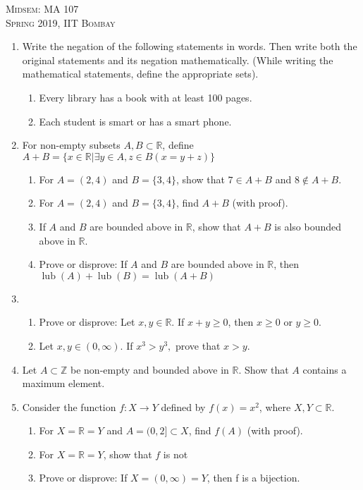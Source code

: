 \documentclass{article}
\begin{document}
\begin{center}
    \textsc{Midsem: MA 107}\\
    \textsc{Spring 2019, IIT Bombay}
\end{center}
\begin{enumerate}[label = (\arabic*)]
    \item Write the negation of the following statements in words. Then write both the original statements and its negation mathematically. (While writing the mathematical statements, define the appropriate sets).
    \begin{enumerate}
        \item Every library has a book with at least 100 pages.
        \item Each student is smart or has a smart phone.
    \end{enumerate}
    \item For non-empty subsets $A, B \subset \mathbb{R}$, define $A+B = \{x\in\mathbb{R}|\exists y\in A, z\in B(x = y+z)\}$
    \begin{enumerate}
        \item For $A = (2, 4)$ and $B = \{3, 4\}$, show that $7 \in A+B$ and $8\not\in A+B$.
        \item For $A = (2, 4)$ and $B = \{3, 4\}$, find $A+B$ (with proof).
        \item If $A$ and $B$ are bounded above in $\mathbb{R}$, show that $A+B$ is also bounded above in $\mathbb{R}$.
        \item Prove or disprove: If $A$ and $B$ are bounded above in $\mathbb{R}$, then $\operatorname{lub}(A)+\operatorname{lub}(B) = \operatorname{lub}(A+B)$
    \end{enumerate}
    \item \begin{enumerate}
        \item Prove or disprove: Let $x, y \in\mathbb{R}.$ If $x+y\ge0$, then $x\ge0$ or $y \ge 0$.
        \item Let $x, y\in(0,\infty)$. If $x^3 > y^3,$ prove that $x > y.$
    \end{enumerate}
    \item Let $A\subset \mathbb{Z}$ be non-empty and bounded above in $\mathbb{R}$. Show that $A$ contains a maximum element.
    \item Consider the function $f: X \to Y$ defined by $f(x) = x^2$, where $X, Y \subset \mathbb{R}$.
    \begin{enumerate}
        \item For $X = \mathbb{R} = Y$ and $A = (0, 2] \subset X$, find $f(A)$ (with proof).
        \item For $X = \mathbb{R} = Y$, show that $f$ is not
        \item Prove or disprove: If $X = (0, \infty) = Y$, then f is a bijection.
    \end{enumerate}
\end{enumerate}
\end{document}
